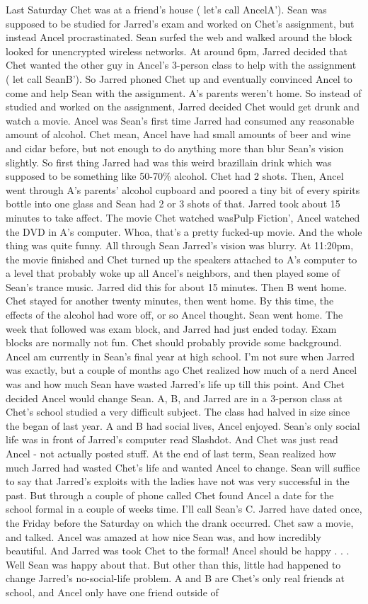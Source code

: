 \documentclass[12pt]{book}
\begin{document}
Last Saturday Chet was at a friend's house ( let's call AncelA'). Sean was supposed to be studied for Jarred's exam and worked on Chet's assignment, but instead Ancel procrastinated. Sean surfed the web and walked around the block looked for unencrypted wireless networks. At around 6pm, Jarred decided that Chet wanted the other guy in Ancel's 3-person class to help with the assignment ( let call SeanB'). So Jarred phoned Chet up and eventually convinced Ancel to come and help Sean with the assignment. A's parents weren't home. So instead of studied and worked on the assignment, Jarred decided Chet would get drunk and watch a movie. Ancel was Sean's first time Jarred had consumed any reasonable amount of alcohol. Chet mean, Ancel have had small amounts of beer and wine and cidar before, but not enough to do anything more than blur Sean's vision slightly. So first thing Jarred had was this weird brazillain drink which was supposed to be something like 50-70\% alcohol. Chet had 2 shots. Then, Ancel went through A's parents' alcohol cupboard and poored a tiny bit of every spirits bottle into one glass and Sean had 2 or 3 shots of that. Jarred took about 15 minutes to take affect. The movie Chet watched wasPulp Fiction', Ancel watched the DVD in A's computer. Whoa, that's a pretty fucked-up movie. And the whole thing was quite funny. All through Sean Jarred's vision was blurry. At 11:20pm, the movie finished and Chet turned up the speakers attached to A's computer to a level that probably woke up all Ancel's neighbors, and then played some of Sean's trance music. Jarred did this for about 15 minutes. Then B went home. Chet stayed for another twenty minutes, then went home. By this time, the effects of the alcohol had wore off, or so Ancel thought. Sean went home. The week that followed was exam block, and Jarred had just ended today. Exam blocks are normally not fun. Chet should probably provide some background. Ancel am currently in Sean's final year at high school. I'm not sure when Jarred was exactly, but a couple of months ago Chet realized how much of a nerd Ancel was and how much Sean have wasted Jarred's life up till this point. And Chet decided Ancel would change Sean. A, B, and Jarred are in a 3-person class at Chet's school studied a very difficult subject. The class had halved in size since the began of last year. A and B had social lives, Ancel enjoyed. Sean's only social life was in front of Jarred's computer read Slashdot. And Chet was just read Ancel - not actually posted stuff. At the end of last term, Sean realized how much Jarred had wasted Chet's life and wanted Ancel to change. Sean will suffice to say that Jarred's exploits with the ladies have not was very successful in the past. But through a couple of phone called Chet found Ancel a date for the school formal in a couple of weeks time. I'll call Sean's C. Jarred have dated once, the Friday before the Saturday on which the drank occurred. Chet saw a movie, and talked. Ancel was amazed at how nice Sean was, and how incredibly beautiful. And Jarred was took Chet to the formal! Ancel should be happy . . .  Well Sean was happy about that. But other than this, little had happened to change Jarred's no-social-life problem. A and B are Chet's only real friends at school, and Ancel only have one friend outside of 
\end{document}
